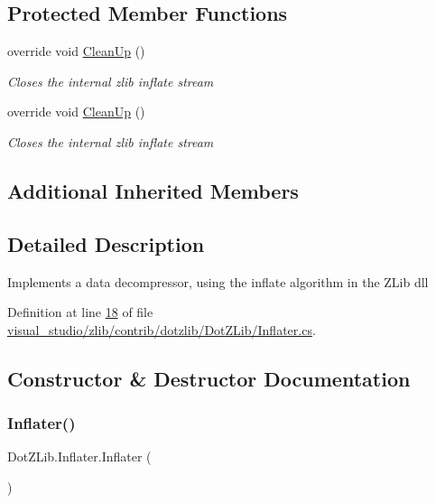 \subsection*{Protected Member Functions}
\begin{DoxyCompactItemize}
\item 
override void \hyperlink{class_dot_z_lib_1_1_inflater_af4ed4f530151f83222d2cb732a77626b}{Clean\+Up} ()
\begin{DoxyCompactList}\small\item\em Closes the internal zlib inflate stream \end{DoxyCompactList}\item 
override void \hyperlink{class_dot_z_lib_1_1_inflater_af4ed4f530151f83222d2cb732a77626b}{Clean\+Up} ()
\begin{DoxyCompactList}\small\item\em Closes the internal zlib inflate stream \end{DoxyCompactList}\end{DoxyCompactItemize}
\subsection*{Additional Inherited Members}


\subsection{Detailed Description}
Implements a data decompressor, using the inflate algorithm in the Z\+Lib dll 



Definition at line \hyperlink{visual__studio_2zlib_2contrib_2dotzlib_2_dot_z_lib_2_inflater_8cs_source_l00018}{18} of file \hyperlink{visual__studio_2zlib_2contrib_2dotzlib_2_dot_z_lib_2_inflater_8cs_source}{visual\+\_\+studio/zlib/contrib/dotzlib/\+Dot\+Z\+Lib/\+Inflater.\+cs}.



\subsection{Constructor \& Destructor Documentation}
\mbox{\label{class_dot_z_lib_1_1_inflater_acb40e9664a78756a3def8ed66aa35ca1}} 
\subsubsection{\texorpdfstring{Inflater()}{Inflater()}\hspace{0.1cm}{\footnotesize\ttfamily [1/2]}}
{\footnotesize\ttfamily Dot\+Z\+Lib.\+Inflater.\+Inflater (\begin{DoxyParamCaption}{ }\end{DoxyParamCaption})\hspace{0.3cm}{\ttfamily [inline]}}



